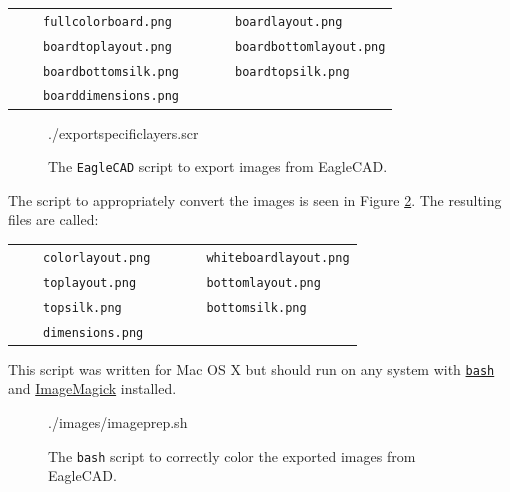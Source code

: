 \documentclass[12pt]{article}
\newcommand{\+}{\item}		%
\newcommand{\sep}{1mm}
\newcommand{\tabitem}{~~\llap{\textbullet}~~}
\newcommand{\colorimagename}{colorlayout.png}
\newcommand{\twolayermonochrome}{whiteboardlayout.png}
\newcommand{\topmonochrome}{toplayout.png}
\newcommand{\bottommonochrome}{bottomlayout.png}
\newcommand{\bottomsilk}{bottomsilk.png}
\newcommand{\topsilk}{topsilk.png}
\newcommand{\boarddimensions}{dimensions.png}
\begin{document}
\bigskip

\begin{tabular}{lll}
\tabitem \texttt{fullcolorboard.png} && \tabitem \texttt{boardlayout.png} \\[\sep]
\tabitem \texttt{boardtoplayout.png} && \tabitem \texttt{boardbottomlayout.png} \\[\sep]
\tabitem \texttt{boardbottomsilk.png} && \tabitem \texttt{boardtopsilk.png} \\[\sep]
\tabitem \texttt{boarddimensions.png} \\[\sep]
\end{tabular}

\begin{figure}
\vspace{-0.5in}

 {./exportspecificlayers.scr}

\caption{The \texttt{EagleCAD} script to export images from EagleCAD.}
\label{fig:codelistexport}
\end{figure}


The script to appropriately convert the images is seen in Figure \ref{fig:codelistconvert}. The resulting files are called: 

\medskip

\begin{tabular}{lll}
\tabitem \texttt{\colorimagename} && \tabitem \texttt{\twolayermonochrome} \\[\sep]
\tabitem \texttt{\topmonochrome} && \tabitem \texttt{\bottommonochrome} \\[\sep]
\tabitem \texttt{\topsilk} && \tabitem \texttt{\bottomsilk} \\[\sep]
\tabitem \texttt{\boarddimensions} \\[\sep]
\end{tabular}
\medskip

\noindent This script was written for Mac OS X but should run on any system with 
{\color{webblue}\href{https://en.wikipedia.org/wiki/Bash_%28Unix_shell%29}{\texttt{bash}}}
and {\color{webblue}\href{http://www.imagemagick.org/script/index.php}{ImageMagick}} installed.

\newpage

\begin{figure}[ht!]
\vspace{-0.5in}

 {./images/imageprep.sh}
\caption{The \texttt{bash} script to correctly color the exported images from EagleCAD.}
\label{fig:codelistconvert}

\end{figure}
\end{document}
